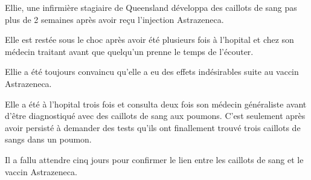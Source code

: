Ellie, une infirmière stagiaire de Queensland développa des caillots de sang pas
plus de 2 semaines après avoir reçu l'injection Astrazeneca.

Elle est restée sous le choc après avoir été plusieurs fois à l'hopital et chez
son médecin traitant avant que quelqu'un prenne le temps de l'écouter.

Ellie a été toujours convaincu qu'elle a eu des effets indésirables suite au
vaccin Astrazeneca.

Elle a été à l'hopital trois fois et consulta deux fois son médecin généraliste
avant d'être diagnostiqué avec des caillots de sang aux poumons. C'est seulement
après avoir persisté à demander des tests qu'ils ont finallement trouvé trois
caillots de sangs dans un poumon.

Il a fallu attendre cinq jours pour confirmer le lien entre les caillots de sang
et le vaccin Astrazeneca.

